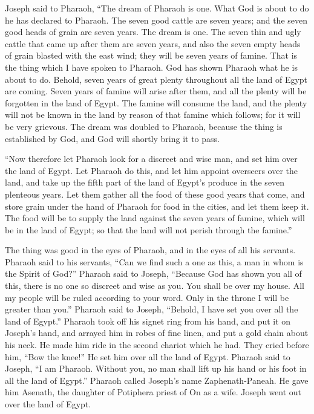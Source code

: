  Joseph said to Pharaoh, ``The dream of Pharaoh is one.
What God is about to do he has declared to Pharaoh.  The
seven good cattle are seven years; and the seven good heads of grain are
seven years. The dream is one.  The seven thin and ugly
cattle that came up after them are seven years, and also the seven empty
heads of grain blasted with the east wind; they will be seven years of
famine.  That is the thing which I have spoken to
Pharaoh. God has shown Pharaoh what he is about to do. 
Behold, seven years of great plenty throughout all the land of Egypt are
coming.  Seven years of famine will arise after them, and
all the plenty will be forgotten in the land of Egypt. The famine will
consume the land,  and the plenty will not be known in
the land by reason of that famine which follows; for it will be very
grievous.  The dream was doubled to Pharaoh, because the
thing is established by God, and God will shortly bring it to pass.

 ``Now therefore let Pharaoh look for a discreet and wise
man, and set him over the land of Egypt.  Let Pharaoh do
this, and let him appoint overseers over the land, and take up the fifth
part of the land of Egypt's produce in the seven plenteous years.
 Let them gather all the food of these good years that
come, and store grain under the hand of Pharaoh for food in the cities,
and let them keep it.  The food will be to supply the
land against the seven years of famine, which will be in the land of
Egypt; so that the land will not perish through the famine.''

 The thing was good in the eyes of Pharaoh, and in the
eyes of all his servants.  Pharaoh said to his servants,
``Can we find such a one as this, a man in whom is the Spirit of God?''
 Pharaoh said to Joseph, ``Because God has shown you all
of this, there is no one so discreet and wise as you. 
You shall be over my house. All my people will be ruled according to
your word. Only in the throne I will be greater than you.''
 Pharaoh said to Joseph, ``Behold, I have set you over
all the land of Egypt.''  Pharaoh took off his signet
ring from his hand, and put it on Joseph's hand, and arrayed him in
robes of fine linen, and put a gold chain about his neck.
 He made him ride in the second chariot which he had.
They cried before him, ``Bow the knee!'' He set him over all the land of
Egypt.  Pharaoh said to Joseph, ``I am Pharaoh. Without
you, no man shall lift up his hand or his foot in all the land of
Egypt.''  Pharaoh called Joseph's name Zaphenath-Paneah.
He gave him Asenath, the daughter of Potiphera priest of On as a wife.
Joseph went out over the land of Egypt.

